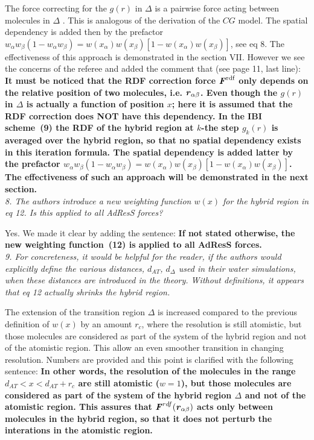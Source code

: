 \documentclass[a4paper]{article}
\renewcommand{\v}[1]{\textbf{\textit{#1}}}
\begin{document}
The force correcting for the $g(r)$ in $\Delta$ is a pairwise force acting between molecules in $\Delta$ . This is analogous of the derivation of the $CG$ model. 
The spatial dependency is
added then by the prefactor $ w_\alpha w_\beta (1-w_\alpha w_\beta)
= w(x_\alpha) w(x_\beta) [1-w(x_\alpha) w(x_\beta)]$, see eq 8.
The effectiveness of this approach is demonstrated in the section VII.
However we see the concerns of the referee and added the comment that (see page 11, last line): {\bf It must be noticed that the RDF correction force $\v F^{\textrm{rdf}}$
  only depends on the
  relative position of two molecules, i.e. $\v r_{\alpha\beta}$.  Even though
  the $g(r)$ in $\Delta$ is actually a function of position $x$; here it is assumed that the RDF correction does NOT have this dependency.
  In the IBI scheme~(9)
  the RDF of the hybrid region at $k$-the step $g_k(r)$ is 
  averaged over the hybrid region, so that no spatial
  dependency exists in this iteration formula.
  The spatial dependency is added latter by the  prefactor
  $ w_\alpha w_\beta (1-w_\alpha w_\beta) = w(x_\alpha) w(x_\beta) [1-w(x_\alpha) w(x_\beta)]$.
  The effectiveness of such an approach will be demonstrated in the next section.}
\\

\textit{
8. The authors introduce a new weighting function $w(x)$ for the hybrid
region in eq 12. Is this applied to all AdResS forces?
}

Yes. We made it clear by adding the sentence: {\bf If not stated otherwise, the new weighting function~(12)
  is applied to all AdResS forces.}
\\

\textit{
9. For concreteness, it would be helpful for the reader, if the
authors would explicitly define the various distances, $d_{{AT}}$, $d_{\Delta}$
used in their water simulations, when these distances are introduced
in the theory. Without definitions, it appears that eq 12 actually
shrinks the hybrid region.
}

The extension of the transition region $\Delta$ is increased compared to the previous definition of $w(x)$ by an amount $r_{c}$, where the resolution is still atomistic, but those molecules are considered as part of the system of the hybrid region and not of the atomistic region. This allow an even smoother transition in changing resolution.
Numbers are provided and this point is clarified with the following sentence:
{\bf
In other words, the resolution of the molecules in the range
$d_{AT} < x < d_{{AT}} + r_c$ are still atomistic
($w=1$), but those molecules are considered as part of the system of
the hybrid region $\Delta$ and not of the atomistic region.
This assures that $\v
F^{{rdf}}(\v r_{\alpha\beta})$ acts only between molecules
in the hybrid region, so that it does not perturb the interations
in the atomistic region.}
\\
\end{document}
